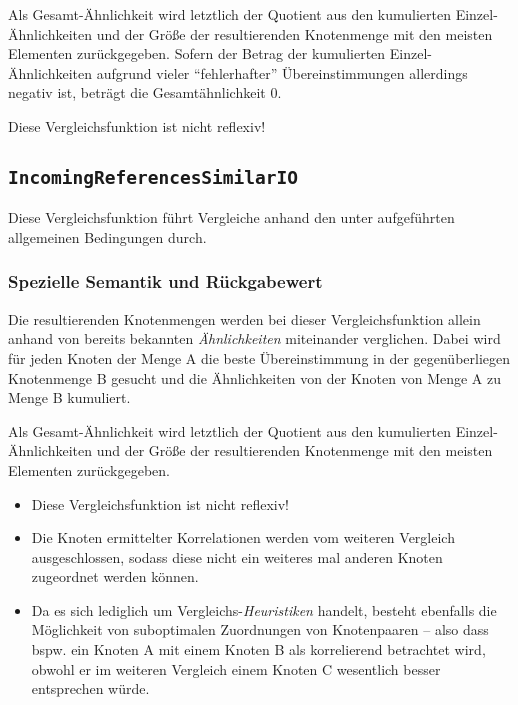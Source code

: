 Als Gesamt-Ähnlichkeit wird letztlich der Quotient aus den kumulierten Einzel-Ähnlichkeiten und der Größe der resultierenden Knotenmenge mit den meisten Elementen zurückgegeben. Sofern der Betrag der kumulierten Einzel-Ähnlichkeiten aufgrund vieler "`fehlerhafter"' Übereinstimmungen allerdings negativ ist, beträgt die Gesamtähnlichkeit $0$.

 Diese Vergleichsfunktion ist nicht reflexiv!

\newpage
%
%
\subsection{\texttt{IncomingReferencesSimilarIO}}
Diese Vergleichsfunktion führt Vergleiche anhand den unter\mylinebreak{} aufgeführten allgemeinen Bedingungen durch.

\subsubsection*{Spezielle Semantik und Rückgabewert}
Die resultierenden Knotenmengen werden bei dieser Vergleichsfunktion allein anhand von bereits bekannten \emph{Ähnlichkeiten} miteinander verglichen. Dabei wird für jeden Knoten der Menge A die beste Übereinstimmung in der gegenüberliegen Knotenmenge B gesucht und die Ähnlichkeiten von der Knoten von Menge A zu Menge B kumuliert.

Als Gesamt-Ähnlichkeit wird letztlich der Quotient aus den kumulierten Einzel-Ähnlichkeiten und der Größe der resultierenden Knotenmenge mit den meisten Elementen zurückgegeben.

\begin{itemize}
	\item Diese Vergleichsfunktion ist nicht reflexiv!
	\item Die Knoten ermittelter Korrelationen werden vom weiteren Vergleich ausgeschlossen, sodass diese nicht ein weiteres mal anderen Knoten zugeordnet werden können.
	\item Da es sich lediglich um Vergleichs-\emph{Heuristiken} handelt, besteht ebenfalls die Möglichkeit von suboptimalen Zuordnungen von Knotenpaaren -- also dass bspw. ein Knoten A mit einem Knoten B als korrelierend betrachtet wird, obwohl er im weiteren Vergleich einem Knoten C wesentlich besser entsprechen würde.
\end{itemize}


%
%
